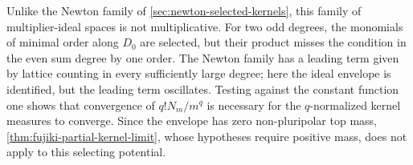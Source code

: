 Unlike the Newton family of \cref{sec:newton-selected-kernels}, this family of multiplier-ideal spaces is not multiplicative. For two odd degrees, the monomials of minimal order along $D_0$ are selected, but their product misses the condition in the even sum degree by one order. The Newton family has a leading term given by lattice counting in every sufficiently large degree; here the ideal envelope is identified, but the leading term oscillates. Testing against the constant function one shows that convergence of $q!N_m/m^q$ is necessary for the $q$-normalized kernel measures to converge. Since the envelope has zero non-pluripolar top mass, \cref{thm:fujiki-partial-kernel-limit}, whose hypotheses require positive mass, does not apply to this selecting potential.
